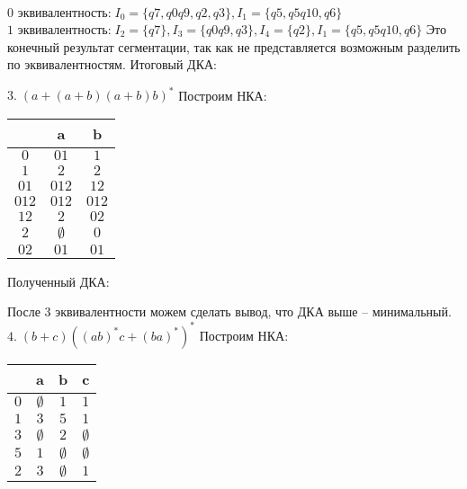 \documentclass[a4paper,12pt]{article}
\begin{document}
$\text{0 эквивалентность:} \; I_0=\{q7,q0q9,q2,q3\},I_1=\{q5,q5q10,q6\}$
$\text{1 эквивалентность:} \; I_2=\{q7\},I_3=\{q0q9,q3\},I_4=\{q2\},I_1=\{q5,q5q10,q6\}$\newline
Это конечный результат сегментации, так как не представляется возможным разделить по эквивалентностям.
Итоговый ДКА:
\begin{center}
\newline
\end{center}
\Large $3.\;(a+(a+b)(a+b)b)^*$\newline
Построим НКА:
\begin{center}
\newline
\end{center}
\begin{center}
\begin{tabular}{ |c|c|c| } 
\hline
  & a & b \\ [0.5ex] 
 \hline
$0$ & $01$ & $1$ \\
$1$ & $2$ & $2$ \\
$01$ & $012$ & $12$ \\
$012$ & $012$ & $012$ \\
$12$ & $2$ & $02$ \\
$2$ & $\emptyset$ & $0$ \\
$02$ & $01$ & $01$ \\
 \hline
\end{tabular}
\end{center}
Полученный ДКА:
\begin{center}
\newline
\end{center}
После 3 эквивалентности можем сделать вывод, что ДКА выше -- минимальный.\newline
\Large $4.\;(b+c)((ab)^*c+(ba)^*)^*$\newline
Построим НКА:
\begin{center}
\newline
\end{center}
\begin{center}
\begin{tabular}{ |c|c|c|c| } 
\hline
  & a & b & c \\ [0.5ex] 
 \hline
$0$ & $\emptyset$ & $1$ & $1$ \\
$1$ & $3$ & $5$ & $1$ \\
$3$ & $\emptyset$ & $2$ & $\emptyset$ \\
$5$ & $1$ & $\emptyset$ & $\emptyset$ \\
$2$ & $3$ & $\emptyset$ & $1$ \\
 \hline
\end{tabular}
\end{center}
\end{document}
